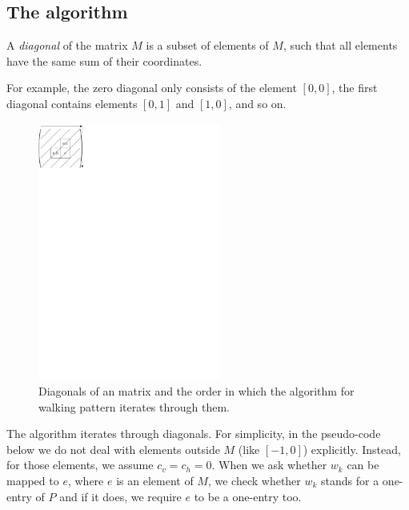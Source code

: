 \subsection{The algorithm}
\begin{defn}
A \emph{diagonal} of the matrix $M$ is a subset of elements of $M$, such that all elements have the same sum of their coordinates.
\end{defn}
For example, the zero diagonal only consists of the element $[0,0]$, the first diagonal contains elements $[0,1]$ and $[1,0]$, and so on.
\begin{figure}[h!]
\centering
\includegraphics[width=60mm]{../img/walking_alg.pdf}
\caption{Diagonals of an matrix and the order in which the algorithm for walking pattern iterates through them.}
\end{figure}

The algorithm iterates through diagonals. For simplicity, in the pseudo-code below we do not deal with elements outside $M$ (like $[-1,0]$) explicitly. Instead, for those elements, we assume $c_v=c_h=0$. When we ask whether $w_k$ can be mapped to $e$, where $e$ is an element of $M$, we check whether $w_k$ stands for a one-entry of $P$ and if it does, we require $e$ to be a one-entry too.

